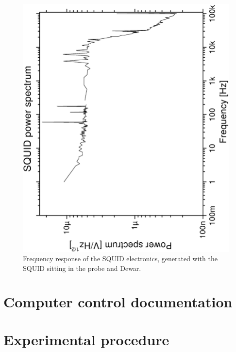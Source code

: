 \begin{figure}[p]
\includegraphics[width=5.7in]{figs/appendixA/origsquidnoise_rot.ps}
\caption[SQUID electronics frequency response]
{Frequency response of the SQUID electronics, generated with the 
SQUID sitting in the probe and Dewar. 
}
\label{fig:freq_response}
\end{figure}

\chapter{Computer control documentation}


\chapter{Experimental procedure}


